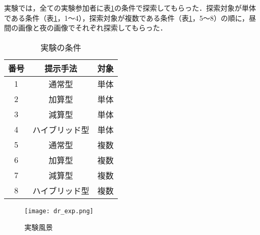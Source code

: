   実験では，全ての実験参加者に表\ref{tab:order}の条件で探索してもらった．探索対象が単体である条件（表\ref{tab:order}，1〜4），探索対象が複数である条件（表\ref{tab:order}，5〜8）の順に，昼間の画像と夜の画像でそれぞれ探索してもらった．

  \begin{table}[tb]
    \caption{実験の条件}
    \label{tab:order}
    \begin{center}
    \begin{tabular}{ccc}
      \hline\hline
      \textbf{番号} & \multicolumn{1}{c}{\textbf{提示手法}} & \textbf{対象} \\
      \hline
      1 & 通常型 & 単体 \\
      2 & 加算型 & 単体 \\
      3 & 減算型 & 単体 \\
      4 & ハイブリッド型 & 単体 \\
      \hline
      5 & 通常型 & 複数 \\
      6 & 加算型 & 複数 \\
      7 & 減算型 & 複数 \\
      8 & ハイブリッド型 & 複数 \\
      \hline
    \end{tabular}
  \end{center}
  \end{table}

  \begin{figure}[tb]
    \begin{center}
      \texttt{[image: dr\_exp.png]}
      \caption{実験風景}
    \end{center}
    \label{fig:exp}
  \end{figure}


